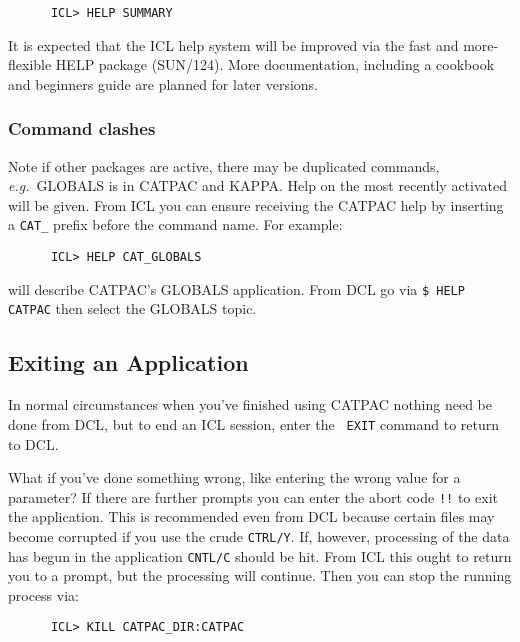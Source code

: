 \begin{verbatim}
      ICL> HELP SUMMARY
\end{verbatim}

It is expected that the {\small ICL} help system will be improved via
the fast and more-flexible {\small HELP} package (SUN/124).  More
documentation, including a cookbook and beginners guide are planned for
later versions.

\subsubsection{Command clashes}

Note if other packages are active, there may be duplicated commands, {\it
e.g.}\ GLOBALS is in {\small CATPAC} and {\small KAPPA}.  Help on the most
recently activated will be given.  From {\small ICL} you can ensure receiving
the {\small CATPAC} help by inserting a {\tt CAT\_} prefix before the command
name.  For example:

\begin{verbatim}
      ICL> HELP CAT_GLOBALS
\end{verbatim}

will describe {\small CATPAC}'s GLOBALS application.  From {\small DCL}
go via {\tt \$ HELP CATPAC} then select the GLOBALS topic.

\subsection{Exiting an Application}

In normal circumstances when you've finished using {\small CATPAC} nothing need
be done from {\small DCL}, but to end an {\small ICL} session, enter the {\tt
EXIT} command to return to {\small DCL}.

What if you've done something wrong, like entering the wrong value for a
parameter?  If there are further prompts you can enter the abort code {\tt !!}
to exit the application.  This is recommended even from {\small DCL} because
certain files may become corrupted if you use the crude {\tt CTRL/Y}. If,
however, processing of the data has begun in the application {\tt CNTL/C}
should be hit.  From {\small ICL} this ought to return you to a prompt, but the
processing will continue.  Then you can stop the running process via:

\begin{verbatim} 
      ICL> KILL CATPAC_DIR:CATPAC 
\end{verbatim} 

